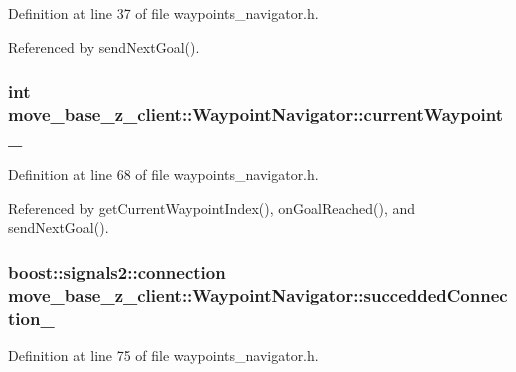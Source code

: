 Definition at line 37 of file waypoints\+\_\+navigator.\+h.



Referenced by send\+Next\+Goal().

\subsubsection[{\texorpdfstring{current\+Waypoint\+\_\+}{currentWaypoint_}}]{\setlength{\rightskip}{0pt plus 5cm}int move\+\_\+base\+\_\+z\+\_\+client\+::\+Waypoint\+Navigator\+::current\+Waypoint\+\_\+}\hypertarget{classmove__base__z__client_1_1WaypointNavigator_a7da763128724f7b08c32c79cb3a88934}{}\label{classmove__base__z__client_1_1WaypointNavigator_a7da763128724f7b08c32c79cb3a88934}


Definition at line 68 of file waypoints\+\_\+navigator.\+h.



Referenced by get\+Current\+Waypoint\+Index(), on\+Goal\+Reached(), and send\+Next\+Goal().

\subsubsection[{\texorpdfstring{succedded\+Connection\+\_\+}{succeddedConnection_}}]{\setlength{\rightskip}{0pt plus 5cm}boost\+::signals2\+::connection move\+\_\+base\+\_\+z\+\_\+client\+::\+Waypoint\+Navigator\+::succedded\+Connection\+\_\+\hspace{0.3cm}{\ttfamily [private]}}\hypertarget{classmove__base__z__client_1_1WaypointNavigator_a139d492345875777d9c9a79f9b2d494b}{}\label{classmove__base__z__client_1_1WaypointNavigator_a139d492345875777d9c9a79f9b2d494b}


Definition at line 75 of file waypoints\+\_\+navigator.\+h.



